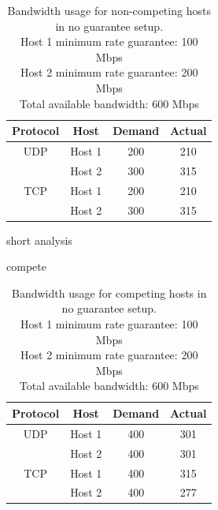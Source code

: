 \documentclass[accepted,single]{gipaper}
\begin{document}
\begin{table}[h]
	\label{ng_nc}
	\vspace{-3mm}
	\begin{center}
		\begin{small}
			\begin{tabular}{cccc}
				Protocol & Host & Demand & Actual \\
				\hline
				UDP & Host 1 & 200 & 210\\
				    & Host 2 & 300 & 315\\
				\hline
				TCP & Host 1 & 200 & 210\\
				    & Host 2 & 300 & 315\\
			\end{tabular}
		\end{small}
	\end{center}
	\caption{Bandwidth usage for non-competing hosts in no guarantee setup.\\
	Host 1 minimum rate guarantee: 100 Mbps\\
	Host 2 minimum rate guarantee: 200 Mbps\\	
	Total available bandwidth: 600 Mbps}
	\vspace{-3mm}
\end{table}

short analysis

compete

\begin{table}[h]
	\label{ng_c}
	\vspace{-3mm}
	\begin{center}
		\begin{small}
			\begin{tabular}{cccc}
				Protocol & Host & Demand & Actual \\
				\hline
				UDP & Host 1 & 400 & 301\\
				    & Host 2 & 400 & 301\\
				\hline
				TCP & Host 1 & 400 & 315\\
				    & Host 2 & 400 & 277\\
			\end{tabular}
		\end{small}
	\end{center}
	\caption{Bandwidth usage for competing hosts in no guarantee setup.\\
	Host 1 minimum rate guarantee: 100 Mbps\\
	Host 2 minimum rate guarantee: 200 Mbps\\	
	Total available bandwidth: 600 Mbps}
	\vspace{-3mm}
\end{table}
\end{document}
